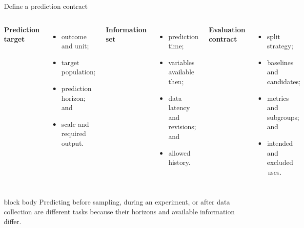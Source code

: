 \documentclass[10pt,aspectratio=169]{beamer}
\begin{document}
\begin{frame}{Define a prediction contract}

\small

\begin{columns}[T]


\textbf{Prediction target}

\begin{itemize}
  \item outcome and unit;
  \item target population;
  \item prediction horizon; and
  \item scale and required output.
\end{itemize}


\textbf{Information set}

\begin{itemize}
  \item prediction time;
  \item variables available then;
  \item data latency and revisions; and
  \item allowed history.
\end{itemize}


\textbf{Evaluation contract}

\begin{itemize}
  \item split strategy;
  \item baselines and candidates;
  \item metrics and subgroups; and
  \item intended and excluded uses.
\end{itemize}

\end{columns}

\vspace{0.35cm}

\begin{beamercolorbox}[rounded=true,sep=8pt]{block body}
Predicting before sampling, during an experiment, or after data collection are different tasks because their horizons and available information differ.
\end{beamercolorbox}

\end{frame}
\end{document}
